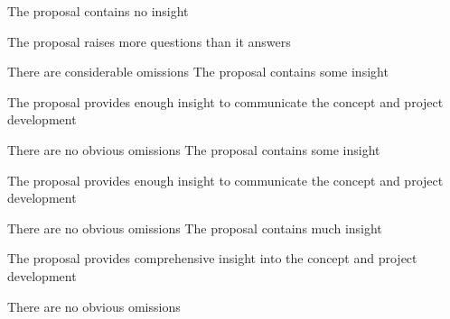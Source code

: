 \begin{markingrubric}
        \grade\fail 	The proposal contains no insight 
            \par 		The proposal raises more questions than it answers 
            \par        There are considerable omissions 
        \grade       	The proposal contains some insight 
            \par 		The proposal provides enough insight to communicate the concept and project development 
            \par        There are no obvious omissions 
        \grade 	        The proposal contains some insight 
            \par 		The proposal provides enough insight to communicate the concept and project development 
            \par        There are no obvious omissions 
        \grade       	The proposal contains much insight 
            \par 		The proposal provides comprehensive insight into the concept and project development 
            \par        There are no obvious omissions 

%
\end{markingrubric}


